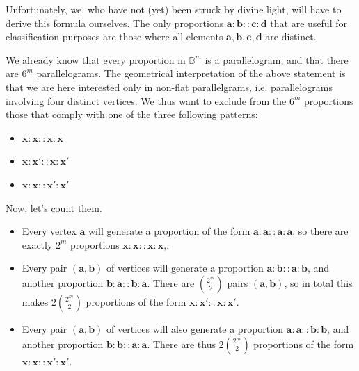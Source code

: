 Unfortunately, we, who have not (yet) been struck by divine light, will have to
derive this formula ourselves. The only proportions
$\mathbf{a} : \mathbf{b} :: \mathbf{c} : \mathbf{d}$ that are useful for
classification purposes are those where all elements $\mathbf{a}, \mathbf{b},
\mathbf{c}, \mathbf{d}$ are distinct.

We already know that every proportion in $\mathbb{B}^m$ is a parallelogram, and
that there are $6^m$ parallelograms. The geometrical interpretation of the
above statement is that we are here interested only in non-flat parallelgrams,
i.e. parallelograms involving four distinct vertices. We thus want to exclude
from the $6^m$ proportions those that comply with one of the three following
patterns:

\begin{itemize}
  \item $\mathbf{x}: \mathbf{x} :: \mathbf{x} : \mathbf{x}$
  \item $\mathbf{x}: \mathbf{x'} :: \mathbf{x} : \mathbf{x'}$
  \item $\mathbf{x}: \mathbf{x} :: \mathbf{x'} : \mathbf{x'}$
\end{itemize}

Now, let's count them.

\begin{itemize}
  \item Every vertex $\mathbf{a}$ will generate a proportion of the form
    $\mathbf{a}: \mathbf{a} :: \mathbf{a} : \mathbf{a}$, so there are exactly
    $2^m$ proportions $\mathbf{x}: \mathbf{x} :: \mathbf{x} : \mathbf{x}$,.
  \item Every pair $(\mathbf{a}, \mathbf{b})$ of vertices will generate a
    proportion $\mathbf{a}: \mathbf{b} :: \mathbf{a} : \mathbf{b}$, and another
    proportion $\mathbf{b}: \mathbf{a} :: \mathbf{b} : \mathbf{a}$. There are
    $\binom{2^m}{2}$ pairs $(\mathbf{a}, \mathbf{b})$, so in total this makes
    $2\binom{2^m}{2}$ proportions of the form $\mathbf{x}: \mathbf{x'} ::
    \mathbf{x} : \mathbf{x'}$. 
  \item Every pair $(\mathbf{a}, \mathbf{b})$ of vertices will also generate a
    proportion $\mathbf{a}: \mathbf{a} :: \mathbf{b} : \mathbf{b}$, and another
    proportion $\mathbf{b}: \mathbf{b} :: \mathbf{a} : \mathbf{a}$. There are
    thus $2\binom{2^m}{2}$ proportions of the form $\mathbf{x}: \mathbf{x} ::
    \mathbf{x'} : \mathbf{x'}$.
\end{itemize}
